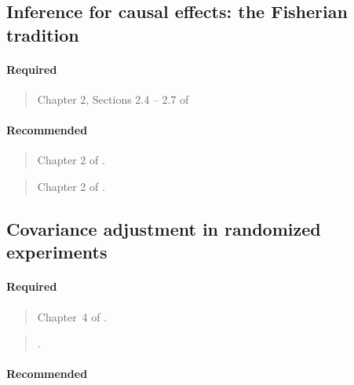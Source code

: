 \documentclass[12pt]{article}
\begin{document}
\begin{verse}  \end{verse}

\subsection{Inference for causal effects: the Fisherian tradition}

\paragraph*{Required}

\begin{verse}
  Chapter 2, Sections 2.4 -- 2.7 of 
\end{verse}

\paragraph*{Recommended}

\begin{verse}
  Chapter 2 of .
\end{verse}

\begin{verse}
  Chapter 2 of .
\end{verse}

\subsection{Covariance adjustment in randomized experiments}

\paragraph*{Required}

\begin{verse}
  Chapter~4 of .
\end{verse}

\begin{verse}
  .
\end{verse}

\begin{verse}  \end{verse}

\paragraph*{Recommended}
\end{document}
